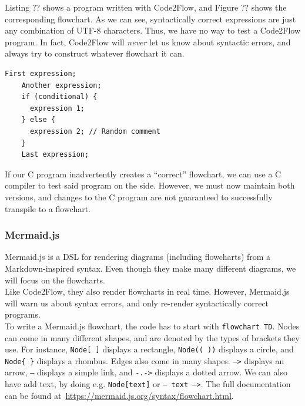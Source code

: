 Listing ?? shows a program written with Code2Flow, and Figure ?? shows the corresponding flowchart. As we can see, syntactically correct expressions are just any combination of UTF-8 characters. Thus, we have no way to test a Code2Flow program. In fact, Code2Flow will \textit{never} let us know about syntactic errors, and always try to construct whatever flowchart it can. \\

\begin{lstlisting}[caption={A Code2Flow program}, captionpos=b, frame=trbl]
    First expression;
    Another expression;
    if (conditional) {
      expression 1;
    } else {
      expression 2; // Random comment
    }
    Last expression;
\end{lstlisting}

If our C program inadvertently creates a ``correct'' flowchart, we can use a C compiler to test said program on the side. However, we must now maintain both versions, and changes to the C program are not guaranteed to successfully transpile to a flowchart. \\

\subsubsection{Mermaid.js}

Mermaid.js is a DSL for rendering diagrams (including flowcharts) from a Markdown-inspired syntax. Even though they make many different diagrams, we will focus on the flowcharts. \\

Like Code2Flow, they also render flowcharts in real time. However, Mermaid.js will warn us about syntax errors, and only re-render syntactically correct programs. \\

To write a Mermaid.js flowchart, the code has to start with \texttt{flowchart TD}. Nodes can come in many different shapes, and are denoted by the types of brackets they use. For instance, \texttt{Node[ ]} displays a rectangle, \texttt{Node(( ))} displays a circle, and \texttt{Node\{ \}} displays a rhombus. Edges also come in many shapes. \texttt{-->} displays an arrow, \texttt{---} displays a simple link, and \texttt{-.->} displays a dotted arrow. We can also have add text, by doing e.g. \texttt{Node[text]} or \texttt{-- text -->}. The full documentation can be found at~\url{https://mermaid.js.org/syntax/flowchart.html}. \\

